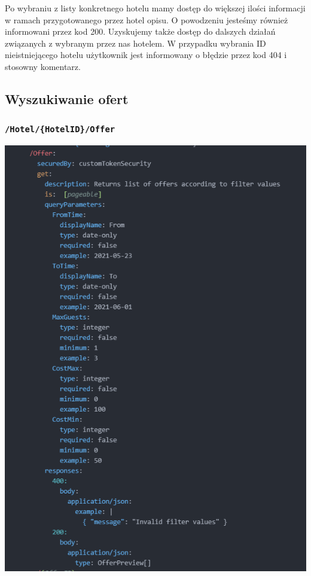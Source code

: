 \documentclass{article}
\begin{document}
Po wybraniu z listy konkretnego hotelu mamy dostęp do większej ilości informacji w ramach przygotowanego przez hotel opisu. O powodzeniu jesteśmy również informowani przez kod 200. Uzyskujemy także dostęp do dalszych działań związanych z wybranym przez nas hotelem. W przypadku wybrania ID nieistniejącego hotelu użytkownik jest informowany o błędzie przez kod 404 i stosowny komentarz.

\subsection{Wyszukiwanie ofert}
\subsubsection{\texttt{/Hotel/\{HotelID\}/Offer}}
\includegraphics[width=\linewidth]{Oferta+Hotel-Raml/Offer_e_Raml.png}
\newpage
\end{document}
